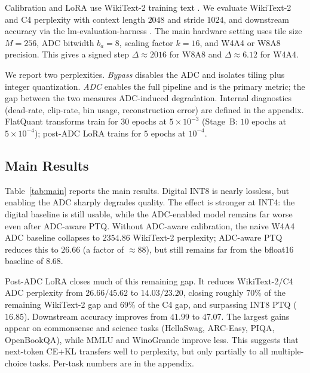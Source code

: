\documentclass[letterpaper]{article} %
\theoremstyle{plain}
\begin{document}
Calibration and LoRA use WikiText-2 training text \cite{merity2017pointer}. We evaluate WikiText-2 and C4 perplexity \cite{raffel2020exploring} with context length $2048$ and stride $1024$, and downstream accuracy via the lm-evaluation-harness \cite{gao2024lmeval}. The main hardware setting uses tile size $M = 256$, ADC bitwidth $b_a = 8$, scaling factor $k = 16$, and W4A4 or W8A8 precision. This gives a signed step $\Delta \approx 2016$ for W8A8 and $\Delta \approx 6.12$ for W4A4.

We report two perplexities. \emph{Bypass} disables the ADC and isolates tiling plus integer quantization. \emph{ADC} enables the full pipeline and is the primary metric; the gap between the two measures ADC-induced degradation. Internal diagnostics (dead-rate, clip-rate, bin usage, reconstruction error) are defined in the appendix. FlatQuant transforms train for $30$ epochs at $5\times10^{-3}$ (Stage~B: $10$ epochs at $5\times10^{-4}$); post-ADC LoRA trains for $5$ epochs at $10^{-4}$.

\subsection{Main Results}

Table~\ref{tab:main} reports the main results. Digital INT8 is nearly lossless, but enabling the ADC sharply degrades quality. The effect is stronger at INT4: the digital baseline is still usable, while the ADC-enabled model remains far worse even after ADC-aware PTQ. Without ADC-aware calibration, the naive W4A4 ADC baseline collapses to $2354.86$ WikiText-2 perplexity; ADC-aware PTQ reduces this to $26.66$ (a factor of $\approx 88$), but still remains far from the bfloat16 baseline of $8.68$.

Post-ADC LoRA closes much of this remaining gap. It reduces WikiText-2/C4 ADC perplexity from $26.66/45.62$ to $14.03/23.20$, closing roughly $70\%$ of the remaining WikiText-2 gap and $69\%$ of the C4 gap, and surpassing INT8 PTQ ($16.85$). Downstream accuracy improves from $41.99$ to $47.07$. The largest gains appear on commonsense and science tasks (HellaSwag, ARC-Easy, PIQA, OpenBookQA), while MMLU and WinoGrande improve less. This suggests that next-token CE+KL transfers well to perplexity, but only partially to all multiple-choice tasks. Per-task numbers are in the appendix.
\end{document}
